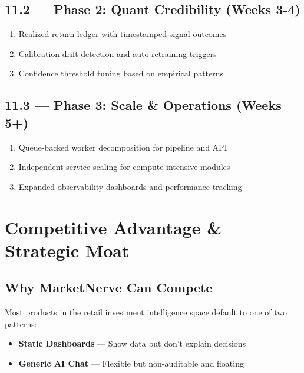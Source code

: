 \documentclass[11pt,a4paper]{article}
\begin{document}
\subsection{11.2 — Phase 2: Quant Credibility (Weeks 3-4)}

\begin{enumerate}[label={\textcolor{mn-blue}{\textbf{2.\arabic*}}}]
    \item Realized return ledger with timestamped signal outcomes
    \item Calibration drift detection and auto-retraining triggers
    \item Confidence threshold tuning based on empirical patterns
\end{enumerate}

\subsection{11.3 — Phase 3: Scale \& Operations (Weeks 5+)}

\begin{enumerate}[label={\textcolor{mn-blue}{\textbf{3.\arabic*}}}]
    \item Queue-backed worker decomposition for pipeline and API
    \item Independent service scaling for compute-intensive modules
    \item Expanded observability dashboards and performance tracking
\end{enumerate}

\section{Competitive Advantage \& Strategic Moat}

\subsection{Why MarketNerve Can Compete}

Most products in the retail investment intelligence space default to one of two patterns:

\begin{tcolorbox}[colback=mn-light, colframe=mn-slate, arc=1mm, boxsep=8pt]
\small
\begin{itemize}
    \item \textbf{Static Dashboards} — Show data but don't explain decisions
    \item \textbf{Generic AI Chat} — Flexible but non-auditable and floating
\end{itemize}
\end{tcolorbox}
\end{document}
